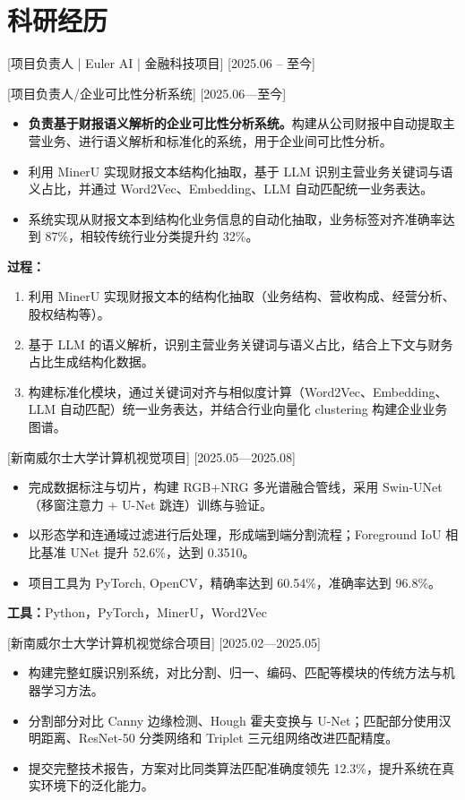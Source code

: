 \documentclass{resume}
\begin{document}
\section{科研经历}
[项目负责人 | Euler AI | 金融科技项目]
[2025.06 -- 至今]

[项目负责人/企业可比性分析系统]
[2025.06—至今]

\begin{itemize}
  \item \textbf{负责基于财报语义解析的企业可比性分析系统。}构建从公司财报中自动提取主营业务、进行语义解析和标准化的系统，用于企业间可比性分析。
  \item 利用 MinerU 实现财报文本结构化抽取，基于 LLM 识别主营业务关键词与语义占比，并通过 Word2Vec、Embedding、LLM 自动匹配统一业务表达。
  \item 系统实现从财报文本到结构化业务信息的自动化抽取，业务标签对齐准确率达到 87\%，相较传统行业分类提升约 32\%。
\end{itemize}

\textbf{过程：}
\begin{enumerate}
  \item 利用 MinerU 实现财报文本的结构化抽取（业务结构、营收构成、经营分析、股权结构等）。
  \item 基于 LLM 的语义解析，识别主营业务关键词与语义占比，结合上下文与财务占比生成结构化数据。
  \item 构建标准化模块，通过关键词对齐与相似度计算（Word2Vec、Embedding、LLM 自动匹配）统一业务表达，并结合行业向量化 clustering 构建企业业务图谱。
\end{enumerate}

[新南威尔士大学计算机视觉项目]
[2025.05—2025.08]
\begin{itemize}
  \item 完成数据标注与切片，构建 RGB+NRG 多光谱融合管线，采用 Swin-UNet（移窗注意力 + U-Net 跳连）训练与验证。
  \item 以形态学和连通域过滤进行后处理，形成端到端分割流程；Foreground IoU 相比基准 UNet 提升 52.6\%，达到 0.3510。
  \item 项目工具为 PyTorch, OpenCV，精确率达到 60.54\%，准确率达到 96.8\%。
\end{itemize}

\textbf{工具：}Python，PyTorch，MinerU，Word2Vec

[新南威尔士大学计算机视觉综合项目]
[2025.02—2025.05]
\begin{itemize}
  \item 构建完整虹膜识别系统，对比分割、归一、编码、匹配等模块的传统方法与机器学习方法。
  \item 分割部分对比 Canny 边缘检测、Hough 霍夫变换与 U-Net；匹配部分使用汉明距离、ResNet-50 分类网络和 Triplet 三元组网络改进匹配精度。
  \item 提交完整技术报告，方案对比同类算法匹配准确度领先 12.3\%，提升系统在真实环境下的泛化能力。
\end{itemize}
\end{document}
